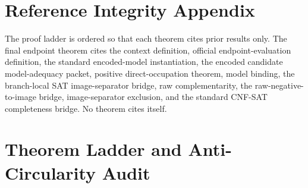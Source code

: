 \documentclass[11pt]{article}
\theoremstyle{definition}
\theoremstyle{remark}
\begin{document}
\section{Reference Integrity Appendix}
The proof ladder is ordered so that each theorem cites prior results only. The final endpoint theorem cites the context definition, official endpoint-evaluation definition, the standard encoded-model instantiation, the encoded candidate model-adequacy packet, positive direct-occupation theorem, model binding, the branch-local SAT image-separator bridge, raw complementarity, the raw-negative-to-image bridge, image-separator exclusion, and the standard CNF-SAT completeness bridge. No theorem cites itself.


\section{Theorem Ladder and Anti-Circularity Audit}
\end{document}
